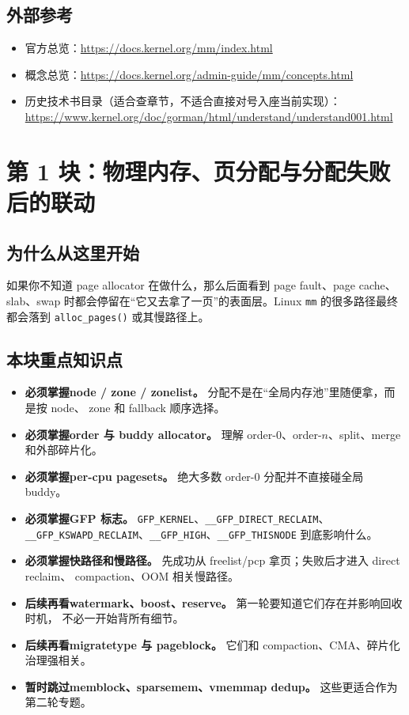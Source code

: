 \documentclass[UTF8,a4paper,11pt]{ctexart}
\newcommand{\musttag}{\colorbox{mmMustBg}{\textbf{必须掌握}}}
\newcommand{\latertag}{\colorbox{mmLaterBg}{\textbf{后续再看}}}
\newcommand{\skiptag}{\colorbox{mmSkipBg}{\textbf{暂时跳过}}}
\begin{document}
\subsection*{外部参考}
\begin{itemize}
  \item 官方总览：\url{https://docs.kernel.org/mm/index.html}
  \item 概念总览：\url{https://docs.kernel.org/admin-guide/mm/concepts.html}
  \item 历史技术书目录（适合查章节，不适合直接对号入座当前实现）：
  \url{https://www.kernel.org/doc/gorman/html/understand/understand001.html}
\end{itemize}

\section{第 1 块：物理内存、页分配与分配失败后的联动}

\subsection*{为什么从这里开始}
如果你不知道 page allocator 在做什么，那么后面看到 page fault、page cache、slab、swap
时都会停留在“它又去拿了一页”的表面层。Linux \texttt{mm} 的很多路径最终都会落到
\texttt{alloc\_pages()} 或其慢路径上。

\subsection*{本块重点知识点}
\begin{itemize}
  \item \musttag \textbf{node / zone / zonelist。} 分配不是在“全局内存池”里随便拿，而是按 node、
  zone 和 fallback 顺序选择。
  \item \musttag \textbf{order 与 buddy allocator。} 理解 order-0、order-\(n\)、split、merge
  和外部碎片化。
  \item \musttag \textbf{per-cpu pagesets。} 绝大多数 order-0 分配并不直接碰全局 buddy。
  \item \musttag \textbf{GFP 标志。} \texttt{GFP\_KERNEL}、\texttt{\_\_GFP\_DIRECT\_RECLAIM}、
  \texttt{\_\_GFP\_KSWAPD\_RECLAIM}、\texttt{\_\_GFP\_HIGH}、\texttt{\_\_GFP\_THISNODE}
  到底影响什么。
  \item \musttag \textbf{快路径和慢路径。} 先成功从 freelist/pcp 拿页；失败后才进入 direct reclaim、
  compaction、OOM 相关慢路径。
  \item \latertag \textbf{watermark、boost、reserve。} 第一轮要知道它们存在并影响回收时机，
  不必一开始背所有细节。
  \item \latertag \textbf{migratetype 与 pageblock。} 它们和 compaction、CMA、碎片化治理强相关。
  \item \skiptag \textbf{memblock、sparsemem、vmemmap dedup。} 这些更适合作为第二轮专题。
\end{itemize}
\end{document}
